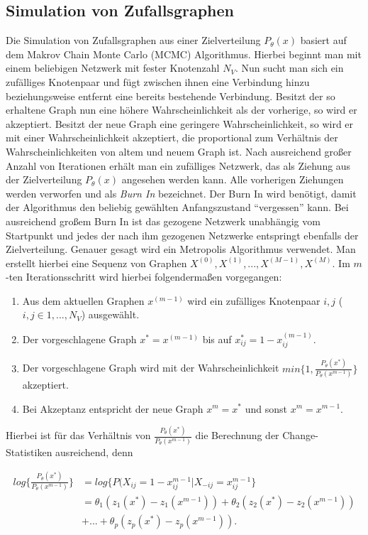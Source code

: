 \documentclass[a4paper,ngerman,oneside,titlepage,bibliography=totoc,11pt]{scrreprt}
\begin{document}
\subsection{Simulation von Zufallsgraphen}
\label{sec:simzuf}
Die Simulation von Zufallsgraphen aus einer Zielverteilung $P_\theta(x)$ basiert auf dem Makrov Chain Monte Carlo (MCMC) Algorithmus. Hierbei beginnt man mit einem beliebigen Netzwerk mit fester Knotenzahl $N_V$. Nun sucht man sich ein zufälliges Knotenpaar und fügt zwischen ihnen eine Verbindung hinzu beziehungsweise entfernt eine bereits bestehende Verbindung. Besitzt der so erhaltene Graph nun eine höhere Wahrscheinlichkeit als der vorherige, so wird er akzeptiert. Besitzt der neue Graph eine geringere Wahrscheinlichkeit, so wird er mit einer Wahrscheinlichkeit akzeptiert, die proportional zum Verhältnis der Wahrscheinlichkeiten von altem und neuem Graph ist. Nach ausreichend großer Anzahl von Iterationen erhält man ein zufälliges Netzwerk, das als Ziehung aus der Zielverteilung $P_\theta(x)$ angesehen werden kann. Alle vorherigen Ziehungen werden verworfen und als \emph{Burn In} bezeichnet. Der Burn In wird benötigt, damit der Algorithmus den beliebig gewählten Anfangszustand "`vergessen"' kann. Bei ausreichend großem Burn In ist das gezogene Netzwerk unabhängig vom Startpunkt und jedes der nach ihm gezogenen Netzwerke entspringt ebenfalls der Zielverteilung.
Genauer gesagt wird ein Metropolis Algorithmus verwendet. Man erstellt hierbei eine Sequenz von Graphen $X^{(0)}, X^{(1)}, ..., X^{(M-1)}, X^{(M)}$. Im $m$-ten Iterationsschritt wird hierbei folgendermaßen vorgegangen:

\begin{enumerate}
	\item Aus dem aktuellen Graphen $x^{(m-1)}$ wird ein zufälliges Knotenpaar $i,j$ ($i,j \in 1, ...,N_V$) ausgewählt.
	\item Der vorgeschlagene Graph $x^* = x^{(m-1)}$ bis auf $x_{ij}^{*} = 1 - x_{ij}^{(m-1)}$.
	\item Der vorgeschlagene Graph wird mit der Wahrscheinlichkeit $min\{1, \frac{P_{\theta}(x^*)}{P_{\theta}(x^{m-1})}\}$ akzeptiert.
	\item Bei Akzeptanz entspricht der neue Graph $x^m = x^*$ und sonst $x^m = x^{m-1}$.
\end{enumerate}
Hierbei ist für das Verhältnis von $\frac{P_{\theta}(x^*)}{P_{\theta}(x^{m-1})}$ die Berechnung der Change-Statistiken ausreichend, denn

\begin{align*}
log\{\frac{P_{\theta}(x^*)}{P_{\theta}(x^{m-1})}\} &= log\{P(X_{ij} = 1-x_{ij}^{m-1}|X_{-ij}=x_{ij}^{m-1}\} \\
																										&= \theta_1(z_1(x^*) - z_1(x^{m-1})) + \theta_2(z_2(x^*) - z_2(x^{m-1}))\\   																									& + ... + \theta_p(z_p(x^*) - z_p(x^{m-1})).
\end{align*}
\end{document}

